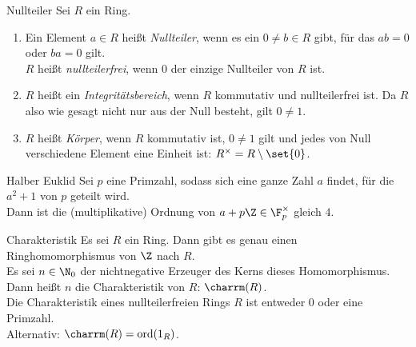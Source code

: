 \begin{karte}{Nullteiler}
    Sei \(R\) ein Ring.
    \begin{enumerate}
        \item Ein Element \(a\in R\) heißt \textit{Nullteiler}, 
        wenn es ein \(0\neq b\in R\) gibt, für das \(ab=0\) oder 
        \(ba = 0\) gilt. \\
        \(R\) heißt \textit{nullteilerfrei}, wenn \(0\) der einzige 
        Nullteiler von \(R\) ist.
        \item \(R\) heißt ein \textit{Integritätsbereich}, wenn \(R\) 
        kommutativ und nullteilerfrei ist. Da \(R\) also wie gesagt 
        nicht nur aus der Null besteht, gilt \(0\neq 1\).
        \item \(R\) heißt \textit{Körper}, wenn \(R\) kommutativ ist, 
        \(0\neq 1\) gilt und jedes von Null verschiedene Element 
        eine Einheit ist: \(R^\times = R \setminus \set{0}\).
    \end{enumerate}
\end{karte}

\begin{karte}{Halber Euklid}
    Sei \(p\) eine Primzahl, sodass sich eine ganze Zahl \(a\) findet, 
    für die \(a^2 + 1\) von \(p\) geteilt wird. \\
    Dann ist die (multiplikative) Ordnung von \(a + p\Z \in \F_p^\times\)
    gleich \(4\).
\end{karte}

\begin{karte}{Charakteristik}
    Es sei \(R\) ein Ring. Dann gibt es genau einen 
    Ringhomomorphismus von \(\Z\) nach \(R\).\\
    Es sei \(n\in \N_0\) der nichtnegative Erzeuger 
    des Kerns dieses Homomorphismus. Dann heißt \(n\)
    die Charakteristik von \(R\): \(\charrm(R)\).\\
    Die Charakteristik eines nullteilerfreien Rings \(R\) 
    ist entweder \(0\) oder eine Primzahl.\\
    Alternativ: \(\charrm(R) = \mathrm{ord}(1_R)\).
\end{karte}

